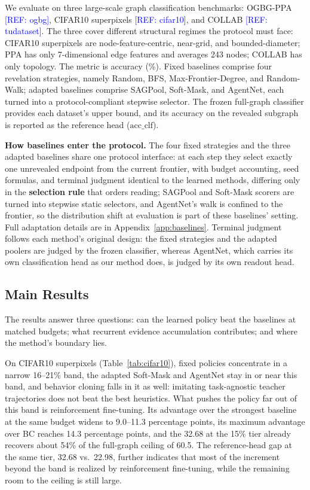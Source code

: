 \documentclass{article}
\newcommand{\refadd}[1]{\textcolor{blue}{[REF: #1]}}
\begin{document}
We evaluate on three large-scale graph classification benchmarks: OGBG-PPA \refadd{ogbg}, CIFAR10 superpixels \refadd{cifar10}, and COLLAB \refadd{tudataset}. The three cover different structural regimes the protocol must face: CIFAR10 superpixels are node-feature-centric, near-grid, and bounded-diameter; PPA has only 7-dimensional edge features and averages 243 nodes; COLLAB has only topology. The metric is accuracy (\%). Fixed baselines comprise four revelation strategies, namely Random, BFS, Max-Frontier-Degree, and Random-Walk; adapted baselines comprise SAGPool, Soft-Mask, and AgentNet, each turned into a protocol-compliant stepwise selector. The frozen full-graph classifier provides each dataset's upper bound, and its accuracy on the revealed subgraph is reported as the reference head ($\mathrm{acc\_clf}$).

\textbf{How baselines enter the protocol.} The four fixed strategies and the three adapted baselines share one protocol interface: at each step they select exactly one unrevealed endpoint from the current frontier, with budget accounting, seed formulas, and terminal judgment identical to the learned methods, differing only in the \textbf{selection rule} that orders reading; SAGPool and Soft-Mask scorers are turned into stepwise static selectors, and AgentNet's walk is confined to the frontier, so the distribution shift at evaluation is part of these baselines' setting. Full adaptation details are in Appendix~\ref{app:baselines}. Terminal judgment follows each method's original design: the fixed strategies and the adapted poolers are judged by the frozen classifier, whereas AgentNet, which carries its own classification head as our method does, is judged by its own readout head.

\subsection{Main Results}
\label{subsec:results}

The results answer three questions: can the learned policy beat the baselines at matched budgets; what recurrent evidence accumulation contributes; and where the method's boundary lies.

On CIFAR10 superpixels (Table~\ref{tab:cifar10}), fixed policies concentrate in a narrow 16--21\% band, the adapted Soft-Mask and AgentNet stay in or near this band, and behavior cloning falls in it as well: imitating task-agnostic teacher trajectories does not beat the best heuristics. What pushes the policy far out of this band is reinforcement fine-tuning. Its advantage over the strongest baseline at the same budget widens to 9.0--11.3 percentage points, its maximum advantage over BC reaches 14.3 percentage points, and the 32.68 at the 15\% tier already recovers about 54\% of the full-graph ceiling of 60.5. The reference-head gap at the same tier, 32.68 vs.\ 22.98, further indicates that most of the increment beyond the band is realized by reinforcement fine-tuning, while the remaining room to the ceiling is still large.
\end{document}
